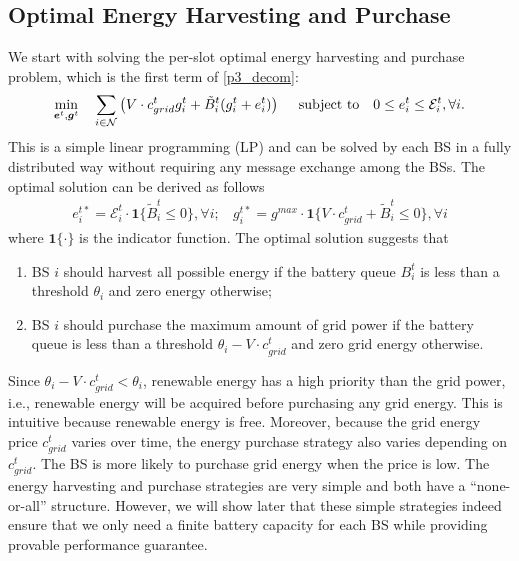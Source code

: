 \documentclass[12pt, draftclsnofoot, letterpaper, onecolumn]{IEEEtran}
\begin{document}
\subsection{Optimal Energy Harvesting and Purchase}
We start with solving the per-slot optimal energy harvesting and purchase problem, which is the first term of \eqref{p3_decom}:
\begin{subequations}
	\begin{align}
	\min_{{\boldsymbol{e}}^t, {\boldsymbol{g}}^t}~~~\sum_{i\in\mathcal{N}} \left(V\cdot c^t_{grid}g^t_i + \tilde{B}^t_i (g^t_i + e^t_i) \right)~~~~
	\text{subject to}~~~0 \leq e^t_i \leq \mathcal{E}_i^t, \forall i.
	\end{align}
\end{subequations}
This is a simple linear programming (LP) and can be solved by each BS in a fully distributed way without requiring any message exchange among the BSs. The optimal solution can be derived as follows
\begin{align}
e^{t*}_i = \mathcal{E}^t_i \cdot \mathbf{1}\{\tilde{B}^t_i \leq 0\}, \forall i;~~~~
g^{t*}_i = g^{max} \cdot \mathbf{1}\{V\cdot c^t_{grid} + \tilde{B}^t_i \leq 0\}, \forall i
\end{align}
where $\mathbf{1}\{\cdot\}$ is the indicator function. The optimal solution suggests that
\begin{enumerate}
\item BS $i$ should harvest all possible energy if the battery queue $B^t_i$ is less than a threshold $\theta_i$ and zero energy otherwise;
\item BS $i$ should purchase the maximum amount of grid power if the battery queue is less than a threshold $\theta_i - V\cdot c^t_{grid}$ and zero grid energy otherwise.
\end{enumerate}

Since $\theta_i - V\cdot c^t_{grid} < \theta_i$, renewable energy has a high priority than the grid power, i.e.,  renewable energy will be acquired before purchasing any grid energy. This is intuitive because renewable energy is free. Moreover, because the grid energy price $c^t_{grid}$ varies over time, the energy purchase strategy also varies depending on $c^t_{grid}$. The BS is more likely to purchase grid energy when the price is low. The energy harvesting and purchase strategies are very simple and both have a ``none-or-all'' structure. However, we will show later that these simple strategies indeed ensure that we only need a finite battery capacity for each BS while providing provable performance guarantee.
\end{document}
